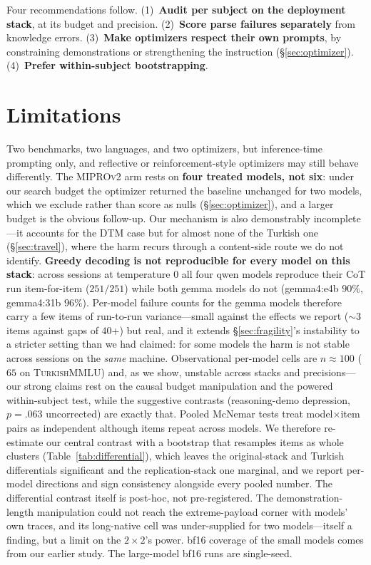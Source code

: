 \documentclass[11pt]{article}
\begin{document}
Four recommendations follow. (1)~\textbf{Audit per subject on the deployment stack}, at
its budget and precision. (2)~\textbf{Score parse failures separately} from knowledge
errors. (3)~\textbf{Make optimizers respect their own prompts}, by constraining
demonstrations or strengthening the instruction (\S\ref{sec:optimizer}).
(4)~\textbf{Prefer within-subject bootstrapping}.

\section*{Limitations}
Two benchmarks, two languages, and two optimizers, but inference-time prompting only,
and reflective or reinforcement-style optimizers may still behave differently. The
\textsc{MIPROv2} arm rests on \textbf{four treated models, not six}: under our search
budget the optimizer returned the baseline unchanged for two models, which we exclude
rather than score as nulls (\S\ref{sec:optimizer}), and a larger budget is the obvious
follow-up. Our mechanism is also demonstrably incomplete---it accounts for the DTM
case but for almost none of the Turkish one (\S\ref{sec:travel}), where the harm
recurs through a content-side route we do not identify. \textbf{Greedy decoding is not
reproducible for every model on this stack}: across sessions at temperature $0$ all four
qwen models reproduce their CoT run item-for-item ($251/251$) while both gemma models do
not (gemma4:e4b $90\%$, gemma4:31b $96\%$). Per-model failure counts for the gemma models
therefore carry a few items of run-to-run variance---small against the effects we report
($\mathord{\sim}3$ items against gaps of $40$+) but real, and it extends
\S\ref{sec:fragility}'s instability to a stricter setting than we had claimed: for some
models the harm is not stable across sessions on the \emph{same} machine. Observational
per-model cells
are $n{\approx}100$ ($65$ on \textsc{TurkishMMLU}) and, as we show, unstable across
stacks and precisions---our strong claims rest on the causal budget manipulation and
the powered within-subject test, while the suggestive contrasts (reasoning-demo
depression, $p{=}.063$ uncorrected) are exactly that. Pooled McNemar tests treat
model$\times$item pairs as independent although items repeat across models. We
therefore re-estimate our central contrast with a bootstrap that resamples items as
whole clusters (Table~\ref{tab:differential}), which leaves the original-stack and
Turkish differentials significant and the replication-stack one marginal, and we report
per-model directions and sign consistency alongside every pooled number. The
differential contrast itself is post-hoc, not pre-registered. The demonstration-length
manipulation could not reach the extreme-payload corner with models' own traces, and
its long-native cell was under-supplied for two models---itself a finding, but a
limit on the $2{\times}2$'s power. bf16 coverage of the small models comes from our
earlier study. The large-model bf16 runs are single-seed.
\end{document}
